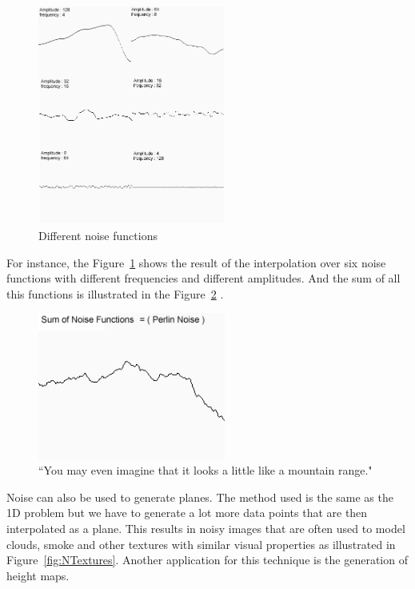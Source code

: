 \begin{figure}[htbp]
	\centering
	\includegraphics[width=0.55\textwidth]{img/Theory/Perlin_Noise/Merge.png}
	\caption{Different noise functions}
	\label{fig:merge}
\end{figure}

For instance, the Figure~\ref{fig:merge} shows the result of the interpolation over six noise functions with different frequencies and different amplitudes. And the sum of all this functions is illustrated in the Figure~\ref{fig:noise} \cite{NoisesELIAS}.

\begin{figure}[htbp]
	\centering
	\includegraphics[width=0.55\textwidth]{img/Theory/Perlin_Noise/perlin1.png}
	\caption{``You may even imagine that it looks a little like a mountain range."}
	\label{fig:noise}
\end{figure}

Noise can also be used to generate planes. The method used is the same as the 1D problem but we have to generate a lot more data points that are then interpolated as a plane. This results in noisy images that are often used to model clouds, smoke and other textures with similar visual properties as illustrated in Figure~\ref{fig:NTextures}. Another application for this technique is the generation of height maps.

